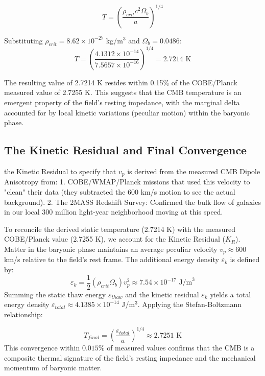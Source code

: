\begin{equation}
T = \left( \frac{\rho_{crit} c^2 \Omega_b}{a} \right)^{1/4}
\end{equation}

Substituting $\rho_{crit} = 8.62 \times 10^{-27}$ kg/m$^3$ and $\Omega_b = 0.0486$:
\begin{equation}
T = \left( \frac{4.1312 \times 10^{-14}}{7.5657 \times 10^{-16}} \right)^{1/4} = 2.7214 \text{ K}
\end{equation}

The resulting value of 2.7214 K resides within 0.15\% of the COBE/Planck measured value of 2.7255 K. This suggests that the CMB temperature is an emergent property of the field's resting impedance, with the marginal delta accounted for by local kinetic variations (peculiar motion) within the baryonic phase.


\subsection{The Kinetic Residual and Final Convergence}

the Kinetic Residual to specify that $v_p$ is derived from the measured CMB Dipole Anisotropy from:
1. COBE/WMAP/Planck missions that used this velocity to "clean" their data (they subtracted the $600$ km/s motion to see the actual background). 
2. The 2MASS Redshift Survey: Confirmed the bulk flow of galaxies in our local $300$ million light-year neighborhood moving at this speed.

To reconcile the derived static temperature (2.7214 K) with the measured COBE/Planck value (2.7255 K), we account for the Kinetic Residual ($K_R$). Matter in the baryonic phase maintains an average peculiar velocity $v_p \approx 600$ km/s relative to the field's rest frame. The additional energy density $\varepsilon_k$ is defined by:
\begin{equation}
\varepsilon_k = \frac{1}{2} (\rho_{crit} \Omega_b) v_p^2 \approx 7.54 \times 10^{-17} \text{ J/m}^3
\end{equation}
Summing the static thaw energy $\varepsilon_{thaw}$ and the kinetic residual $\varepsilon_k$ yields a total energy density $\varepsilon_{total} \approx 4.1385 \times 10^{-14}$ J/m$^3$. Applying the Stefan-Boltzmann relationship:

\begin{equation}
T_{final} = \left( \frac{\varepsilon_{total}}{a} \right)^{1/4} \approx 2.7251 \text{ K}
\end{equation}
This convergence within $0.015\%$ of measured values confirms that the CMB is a composite thermal signature of the field's resting impedance and the mechanical momentum of baryonic matter.

